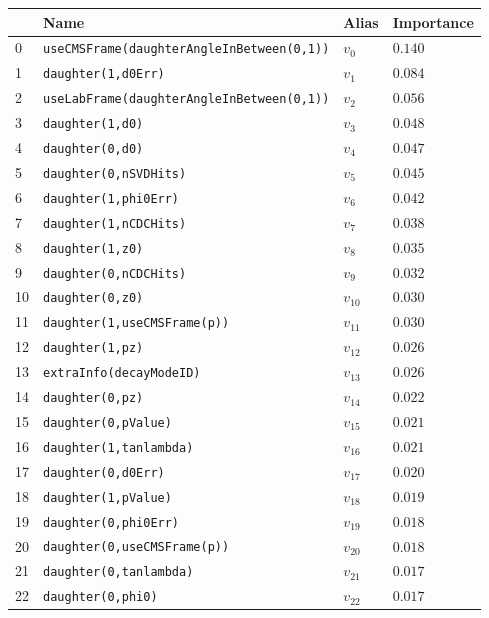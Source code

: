 \begin{longtable}{| p{} | p{} | p{} |p{} |}
\hline
& Name & Alias & Importance \\ \hline
0 &\texttt{useCMSFrame(daughterAngleInBetween(0,1))} & $v_{0}$ & $0.140$ \\ \hline
1 &\texttt{daughter(1,d0Err)} & $v_{1}$ & $0.084$ \\ \hline
2 &\texttt{useLabFrame(daughterAngleInBetween(0,1))} & $v_{2}$ & $0.056$ \\ \hline
3 &\texttt{daughter(1,d0)} & $v_{3}$ & $0.048$ \\ \hline
4 &\texttt{daughter(0,d0)} & $v_{4}$ & $0.047$ \\ \hline
5 &\texttt{daughter(0,nSVDHits)} & $v_{5}$ & $0.045$ \\ \hline
6 &\texttt{daughter(1,phi0Err)} & $v_{6}$ & $0.042$ \\ \hline
7 &\texttt{daughter(1,nCDCHits)} & $v_{7}$ & $0.038$ \\ \hline
8 &\texttt{daughter(1,z0)} & $v_{8}$ & $0.035$ \\ \hline
9 &\texttt{daughter(0,nCDCHits)} & $v_{9}$ & $0.032$ \\ \hline
10 &\texttt{daughter(0,z0)} & $v_{10}$ & $0.030$ \\ \hline
11 &\texttt{daughter(1,useCMSFrame(p))} & $v_{11}$ & $0.030$ \\ \hline
12 &\texttt{daughter(1,pz)} & $v_{12}$ & $0.026$ \\ \hline
13 &\texttt{extraInfo(decayModeID)} & $v_{13}$ & $0.026$ \\ \hline
14 &\texttt{daughter(0,pz)} & $v_{14}$ & $0.022$ \\ \hline
15 &\texttt{daughter(0,pValue)} & $v_{15}$ & $0.021$ \\ \hline
16 &\texttt{daughter(1,tanlambda)} & $v_{16}$ & $0.021$ \\ \hline
17 &\texttt{daughter(0,d0Err)} & $v_{17}$ & $0.020$ \\ \hline
18 &\texttt{daughter(1,pValue)} & $v_{18}$ & $0.019$ \\ \hline
19 &\texttt{daughter(0,phi0Err)} & $v_{19}$ & $0.018$ \\ \hline
20 &\texttt{daughter(0,useCMSFrame(p))} & $v_{20}$ & $0.018$ \\ \hline
21 &\texttt{daughter(0,tanlambda)} & $v_{21}$ & $0.017$ \\ \hline
22 &\texttt{daughter(0,phi0)} & $v_{22}$ & $0.017$ \\ \hline

\end{longtable}

